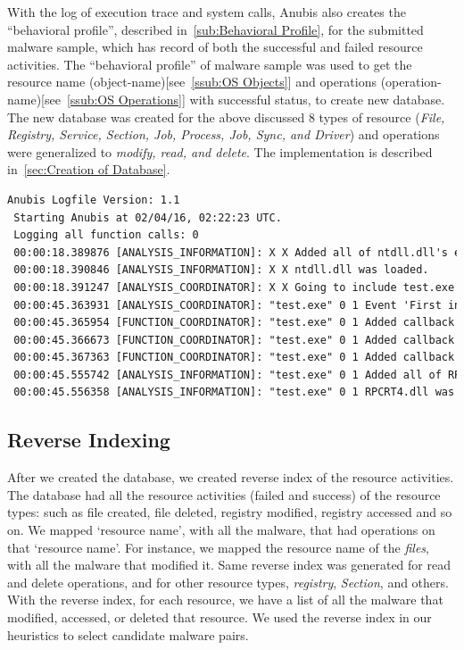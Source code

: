 With the log of execution trace and system calls, Anubis also creates the ``behavioral profile'', described in~\autoref{sub:Behavioral Profile}, for the submitted malware sample, which has record of both the successful and failed resource activities.
The ``behavioral profile'' of malware sample was used to get the resource name (object-name)[see~\autoref{ssub:OS Objects}] and operations (operation-name)[see~\autoref{ssub:OS Operations}] with successful status, to create new database.
The new database was created for the above discussed 8 types of resource (\emph{File, Registry, Service, Section, Job, Process, Job, Sync, and Driver}) and operations were generalized to \emph{modify, read, and delete}.
The implementation is described in~\autoref{sec:Creation of Database}.
\begin{lstlisting}[float,floatplacement=ht,language=TeX,caption={Snippet of Anubis Log},label={lst:anubislog}]
 Anubis Logfile Version: 1.1
 Starting Anubis at 02/04/16, 02:22:23 UTC.
 Logging all function calls: 0
 00:00:18.389876 [ANALYSIS_INFORMATION]: X X Added all of ntdll.dll's exported functions to the function Addresses Map.
 00:00:18.390846 [ANALYSIS_INFORMATION]: X X ntdll.dll was loaded.
 00:00:18.391247 [ANALYSIS_COORDINATOR]: X X Going to include test.exe with PDB 0x04660000 in the analysis.
 00:00:45.363931 [ANALYSIS_COORDINATOR]: "test.exe" 0 1 Event 'First instruction of the process' happened.
 00:00:45.365954 [FUNCTION_COORDINATOR]: "test.exe" 0 1 Added callback for function NtOpenKey (7C90D5B0)
 00:00:45.366673 [FUNCTION_COORDINATOR]: "test.exe" 0 1 Added callback for function NtDeleteKey (7C90D230)
 00:00:45.367363 [FUNCTION_COORDINATOR]: "test.exe" 0 1 Added callback for function NtCreateKey (7C90D0D0)
 00:00:45.555742 [ANALYSIS_INFORMATION]: "test.exe" 0 1 Added all of RPCRT4.dll's exported functions to the function Addresses Map.
 00:00:45.556358 [ANALYSIS_INFORMATION]: "test.exe" 0 1 RPCRT4.dll was loaded.
\end{lstlisting}
\subsection{Reverse Indexing}
\label{sub:Reverse Indexing}
After we created the database, we created reverse index of the resource activities.
The database had all the resource activities (failed and success) of the resource types: such as file created, file deleted, registry modified, registry accessed and so on.
We mapped `resource name', with all the malware, that had operations on that `resource name'.
For instance, we mapped the resource name of the \emph{files}, with all the malware that modified it.
Same reverse index was generated for read and delete operations, and for other resource types, \emph{registry}, \emph{Section}, and others.
With the reverse index, for each resource, we have a list of all the malware that modified, accessed, or deleted that resource.
We used the reverse index in our heuristics to select candidate malware pairs.
